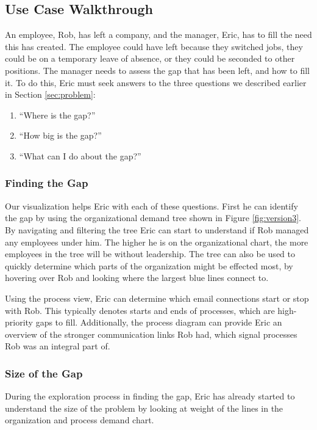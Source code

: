 \documentclass[journal]{vgtc}                %
\begin{document}
\subsection{Use Case Walkthrough}
An employee, Rob, has left a company, and the manager, Eric, has to fill the need this has created. The employee could have left because they switched jobs, they could be on a temporary leave of absence, or they could be seconded to other positions. The manager needs to assess the gap that has been left, and how to fill it. To do this, Eric must seek answers to the three questions we described earlier in Section \ref{sec:problem}:

\begin{enumerate}
\item ``Where is the gap?''
\item ``How big is the gap?''
\item ``What can I do about the gap?''
\end{enumerate}

\subsubsection{Finding the Gap}
Our visualization helps Eric with each of these questions.  First he can identify the gap by using the organizational demand tree shown in Figure \ref{fig:version3}.  By navigating and filtering the tree Eric can start to understand if Rob managed any employees under him. The higher he is on the organizational chart, the more employees in the tree will be without leadership. The tree can also be used to quickly determine which parts of the organization might be effected most, by hovering over Rob and looking where the largest blue lines connect to.

Using the process view, Eric can determine which email connections start or stop with Rob.  This typically denotes starts and ends of processes, which are high-priority gaps to fill.  Additionally, the process diagram can provide Eric an overview of the stronger communication links Rob had, which signal processes Rob was an integral part of.

\subsubsection{Size of the Gap}
During the exploration process in finding the gap, Eric has already started to understand the size of the problem by looking at weight of the lines in the organization and process demand chart.
\end{document}

